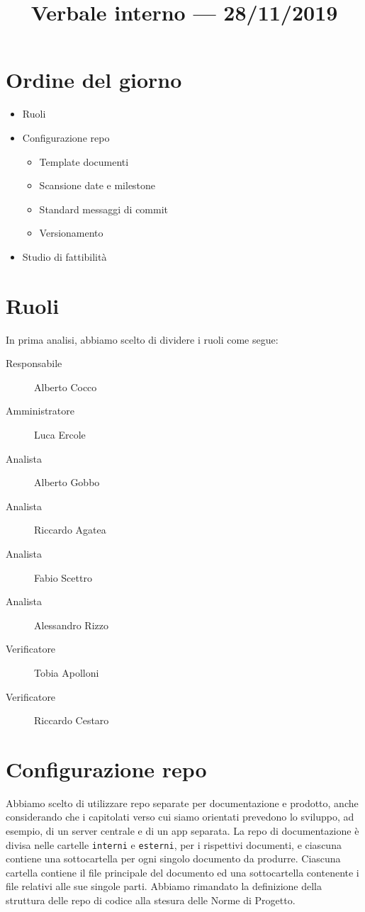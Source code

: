 \documentclass{article}
\title{Verbale interno --- 28/11/2019}
\begin{document}


\section{Ordine del giorno}%
\label{sec:ordine_del_giorno}

\begin{itemize}
  \item Ruoli
  \item Configurazione repo
        \begin{itemize}
          \item Template documenti
          \item Scansione date e milestone
          \item Standard messaggi di commit
          \item Versionamento
        \end{itemize}
  \item Studio di fattibilità
\end{itemize}

\section{Ruoli}%
\label{sec:ruoli}

In prima analisi, abbiamo scelto di dividere i ruoli come segue:

\begin{description}
  \item[Responsabile] Alberto Cocco
  \item[Amministratore] Luca Ercole
  \item[Analista] Alberto Gobbo
  \item[Analista] Riccardo Agatea
  \item[Analista] Fabio Scettro
  \item[Analista] Alessandro Rizzo
  \item[Verificatore] Tobia Apolloni
  \item[Verificatore] Riccardo Cestaro
\end{description}

\section{Configurazione repo}%
\label{sec:configurazione_repo}

Abbiamo scelto di utilizzare repo separate per documentazione e prodotto, anche considerando che i capitolati verso cui siamo orientati prevedono lo sviluppo, ad esempio, di un server centrale e di un app separata.
La repo di documentazione è divisa nelle cartelle \verb|interni| e \verb|esterni|, per i rispettivi documenti, e ciascuna contiene una sottocartella per ogni singolo documento da produrre.
Ciascuna cartella contiene il file principale del documento ed una sottocartella contenente i file relativi alle sue singole parti.
Abbiamo rimandato la definizione della struttura delle repo di codice alla stesura delle Norme di Progetto.
\end{document}
